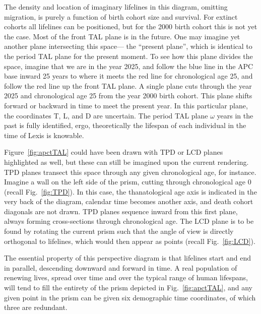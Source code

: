 \documentclass[12pt,oneside,a4paper]{article} %
\theoremstyle{definition}
\begin{document}
The density and location of imaginary lifelines in this diagram, omitting
migration, is purely a function of birth cohort size and survival. For extinct
cohorts all lifelines can be positioned, but for the 2000 birth cohort this is
not yet the case. Most of the front TAL plane is in the future. One may imagine
yet another plane intersecting this space--- the ``present plane'', which is
identical to the period TAL plane for the present moment. To see how this plane
divides the space, imagine that we are in the year 2025, and follow the blue
line in the APC base inward 25 years to where it meets the red line for chronological age 25, and follow the
red line up the front TAL plane. A single plane cuts through the year
2025 and chronological age 25 from the year 2000 birth cohort. This plane
shifts forward or backward in time to meet the present year. In this particular
plane, the coordinates T, L, and D are uncertain. The period TAL plane $\omega$
years in the past is fully identified, ergo, theoretically the lifespan of each
individual in the time of Lexis is knowable. 

Figure~\ref{fig:apctTAL} could have been drawn with TPD or LCD planes highlighted
as well, but these can still be imagined upon the current rendering. TPD planes
transect this space through any given chronological age, for instance. Imagine a
wall on the left side of the prism, cutting through chronological age 0 (recall
Fig.~\ref{fig:TPD}).
In this case, the thanatological age axis is indicated in the very back of the diagram,
calendar time becomes another axis, and death cohort diagonals are not drawn.
TPD planes sequence inward from this first plane, always forming cross-sections
through chronological age. The LCD plane is to be found by rotating the current
prism such that the angle of view is directly orthogonal to lifelines, which
would then appear as points (recall Fig.~\ref{fig:LCD}).

The essential property of this perspective diagram is that lifelines
start and end in parallel, descending downward and forward in time. A real
population of renewing lives, spread over time and over the typical range of
human lifespans, will tend to fill the entirety of the prism depicted in
Fig.~\ref{fig:apctTAL}, and any given point in the prism can be given six
demographic time coordinates, of which three are redundant.

\FloatBarrier
\end{document}

